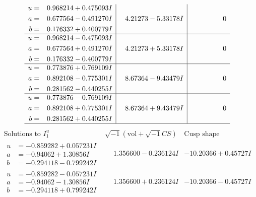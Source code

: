 \documentclass[1p]{elsarticle_modified}
\theoremstyle{definition}
\newcommand{\I}{\sqrt{-1}}
\begin{document}
$$\begin{array}{c|c|c}
\begin{aligned}
u &= \phantom{-}0.968214 + 0.475093 I \\
a &= \phantom{-}0.677564 - 0.491270 I \\
b &= \phantom{-}0.176332 + 0.400779 I\end{aligned}
 & \phantom{-}4.21273 - 5.33178 I & \phantom{-0.000000 } 0 \\ \hline\begin{aligned}
u &= \phantom{-}0.968214 - 0.475093 I \\
a &= \phantom{-}0.677564 + 0.491270 I \\
b &= \phantom{-}0.176332 - 0.400779 I\end{aligned}
 & \phantom{-}4.21273 + 5.33178 I & \phantom{-0.000000 } 0 \\ \hline\begin{aligned}
u &= \phantom{-}0.773876 + 0.769109 I \\
a &= \phantom{-}0.892108 - 0.775301 I \\
b &= \phantom{-}0.281562 - 0.440255 I\end{aligned}
 & \phantom{-}8.67364 - 9.43479 I & \phantom{-0.000000 } 0 \\ \hline\begin{aligned}
u &= \phantom{-}0.773876 - 0.769109 I \\
a &= \phantom{-}0.892108 + 0.775301 I \\
b &= \phantom{-}0.281562 + 0.440255 I\end{aligned}
 & \phantom{-}8.67364 + 9.43479 I & \phantom{-0.000000 } 0\\
 \hline 
 \end{array}$$\newpage$$\begin{array}{c|c|c}  
\text{Solutions to }I^u_{1}& \I (\text{vol} + \sqrt{-1}CS) & \text{Cusp shape}\\
 \hline 
\begin{aligned}
u &= -0.859282 + 0.057231 I \\
a &= -0.94062 + 1.30856 I \\
b &= -0.294118 - 0.799242 I\end{aligned}
 & \phantom{-}1.356600 - 0.236124 I & -10.20366 + 0.45727 I \\ \hline\begin{aligned}
u &= -0.859282 - 0.057231 I \\
a &= -0.94062 - 1.30856 I \\
b &= -0.294118 + 0.799242 I\end{aligned}
 & \phantom{-}1.356600 + 0.236124 I & -10.20366 - 0.45727 I \\ \hline\begin{aligned}

\end{aligned}
\end{array}$$
\end{document}
